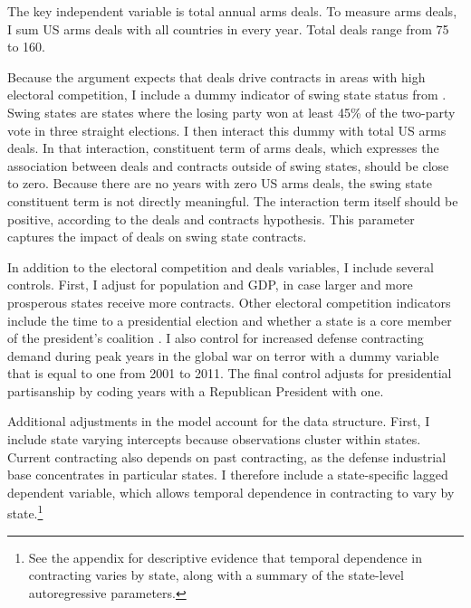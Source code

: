 \documentclass[12pt]{article}
\begin{document}
The key independent variable is total annual arms deals.  
To measure arms deals, I sum US arms deals with all countries in every year. 
Total deals range from 75 to 160. 


Because the argument expects that deals drive contracts in areas with high electoral competition, I include a dummy indicator of swing state status from \citep{KrinerReeves2015}.
Swing states are states where the losing party won at least 45\% of the two-party vote in three straight elections. 
I then interact this dummy with total US arms deals. 
In that interaction, constituent term of arms deals, which expresses the association between deals and contracts outside of swing states, should be close to zero.
Because there are no years with zero US arms deals, the swing state constituent term is not directly meaningful.  
The interaction term itself should be positive, according to the deals and contracts hypothesis.
This parameter captures the impact of deals on swing state contracts. 


In addition to the electoral competition and deals variables, I include several controls. 
First, I adjust for population and GDP, in case larger and more prosperous states receive more contracts. 
Other electoral competition indicators include the time to a presidential election and whether a state is a core member of the president's coalition \citep{KrinerReeves2015}. 
I also control for increased defense contracting demand during peak years in the global war on terror with a dummy variable that is equal to one from 2001 to 2011. 
The final control adjusts for presidential partisanship by coding years with a Republican President with one. 


Additional adjustments in the model account for the data structure.
First, I include state varying intercepts because observations cluster within states. 
Current contracting also depends on past contracting, as the defense industrial base concentrates in particular states. 
I therefore include a state-specific lagged dependent variable, which allows temporal dependence in contracting to vary by state.\footnote{See the appendix for descriptive evidence that temporal dependence in contracting varies by state, along with a summary of the state-level autoregressive parameters.}


\end{document}

